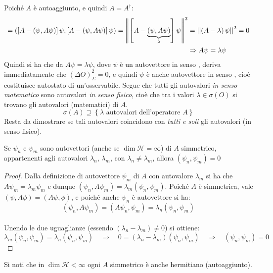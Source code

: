 \documentclass[../../FisicaTeorica.tex]{subfiles}
\begin{document}
Poiché $A$ è autoaggiunto, e quindi $A=A^\dag$:
\begin{align}
\nonumber =\left(\left[A-\left(\psi,A\psi\right)\right]\psi,\left[A-\left(\psi,A\psi\right)\right]\psi\right)=\left\lVert\left[A-\underbrace{\left(\psi,A\psi\right)}_{\lambda}\right]\psi\right\rVert^2&=\left|\left|\left(A-\lambda\right)\psi\right|\right|^2 = 0\\
\label{eqn:fluttuazione-autoaggiunto}
 &\Rightarrow A\psi=\lambda\psi
\end{align}
Quindi si ha che da $A\psi = \lambda \psi$, dove $\psi$ è un autovettore in senso , deriva immediatamente che $(\Delta O)_\Sigma^2 = 0$, e quindi $\psi$ è anche autovettore in senso , cioè costituisce autostato di un'osservabile. Segue che tutti gli autovalori \textit{in senso matematico} sono autovalori \textit{in senso fisico}, cioè che tra i valori $\lambda \in \sigma \left(O\right)$ si trovano gli autovalori (matematici) di $A$.
\[
\sigma\left(A\right)\supseteq\left\{\lambda\text{ autovalori dell'operatore } A\right\}
\]
Resta da dimostrare se tali autovalori  coincidono con \textit{tutti e soli} gli autovalori (in senso fisico).\\

\begin{thm}
Se $\psi_n$ e $\psi_m$ sono autovettori (anche se $\dim{\mathcal{H}=\infty}$) di $A$ simmetrico, appartenenti agli autovalori $\lambda_n$, $\lambda_m$, con $\lambda_n\neq \lambda_m$, allora $\left(\psi_n, \psi_m\right)=0$
\end{thm}
\begin{proof} Dalla definizione di autovettore $\psi_m$ di $A$ con autovalore $\lambda_m$ si ha che $A\psi_m = \lambda_m \psi_m$ e dunque $\left(\psi_n, A\psi_m\right)=\lambda_m\left(\psi_n, \psi_m\right)$.
Poiché $A$ è simmetrica, vale $(\psi, A \phi) = (A \psi, \phi)$, e poiché anche $\psi_n$ è autovettore si ha:
\[ (\psi_n, A\psi_m) = (A\psi_n, \psi_m) = \lambda_n (\psi_n, \psi_m)\]\\
Unendo le due uguaglianze (essendo $\left(\lambda_n-\lambda_m\right)\neq 0$) si ottiene:
\[
\lambda_m (\psi_n, \psi_m) = \lambda_n (\psi_n, \psi_m) \quad \Rightarrow \quad 0 = (\lambda_n -\lambda_m)(\psi_n, \psi_m) \quad \Rightarrow \quad (\psi_n, \psi_m) = 0
\]
\end{proof}
Si noti che in $\dim{\mathcal{H}<\infty}$ ogni $A$ simmetrico è anche hermitiano (autoaggiunto).\\ %
\end{document}
